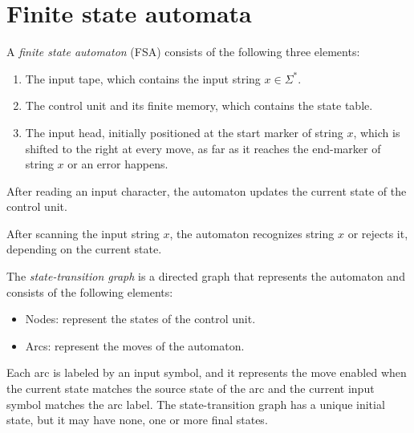 \section{Finite state automata}

\begin{definition}
    A \emph{finite state automaton} (FSA) consists of the following three elements: 
    \begin{enumerate}
        \item The input tape, which contains the input string $x \in \Sigma^{*}$. 
        \item The control unit and its finite memory, which contains the state table.  
        \item The input head, initially positioned at the start marker of string $x$, which is shifted to the right at every move, as far as it reaches the end-marker of string $x$ or an error happens.
    \end{enumerate}
\end{definition}

After reading an input character, the automaton updates the current state of the control unit. 

After scanning the input string $x$, the automaton recognizes string $x$ or rejects it, depending on the current state.

\begin{definition}
    The \emph{state-transition graph} is a directed graph that represents the automaton and consists of the following elements: 
    \begin{itemize}
        \item Nodes: represent the states of the control unit. 
        \item Arcs: represent the moves of the automaton. 
    \end{itemize}
\end{definition}

Each arc is labeled by an input symbol, and it represents the move enabled when the current state matches the source state of the arc and the current input symbol matches the arc label. 
The state-transition graph has a unique initial state, but it may have none, one or more final states. 


